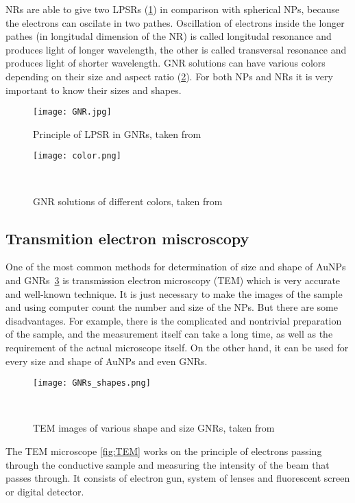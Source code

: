         NRs are able to give two LPSRs (\ref{fig:GNR}) in comparison with spherical NPs, because the electrons can oscilate in two pathes. Oscillation of electrons inside the longer pathes
        (in longitudal dimension of the NR) is called longitudal resonance and produces light of longer wavelength, the other is called transversal resonance and
        produces light of shorter wavelength. GNR solutions can have various colors depending on their size and aspect ratio (\ref{fig:color}). \cite{4, 5, 6, 7, 8}
        For both NPs and NRs it is very important to know their sizes and shapes.
        
        \begin{figure}[h]
            \texttt{[image: GNR.jpg]}
            \caption{Principle of LPSR in GNRs, taken from~\cite{19}}
            \label{fig:GNR}
        \end{figure}

        \begin{figure}[h]
            \texttt{[image: color.png]}
            \caption{GNR solutions of different colors, taken from~\cite{32}}~\label{fig:color}
        \end{figure}

\subsection{Transmition electron miscroscopy}

        One of the most common methods for determination of size and shape of AuNPs and GNRs~\ref{fig:GNR_shape} is transmission electron microscopy (TEM) which is very accurate and well-known technique.
        It is just necessary to make the images of the sample and using computer count the number and size of the NPs. But there are some disadvantages. For example,
        there is the complicated and nontrivial preparation of the sample, and the measurement itself can take a long time, as well as the requirement of the actual microscope itself.
        On the other hand, it can be used for every size and shape of AuNPs and even GNRs.~\cite{42}

        \begin{figure}[h]
            \texttt{[image: GNRs\_shapes.png]}
            \caption{TEM images of various shape and size GNRs, taken from~\cite{20}}~\label{fig:GNR_shape}
        \end{figure}

        The TEM microscope \ref{fig:TEM} works on the principle of electrons passing through the conductive sample and measuring the intensity of the beam that passes through.
        It consists of electron gun, system of lenses and fluorescent screen or digital detector.~\cite{7}

